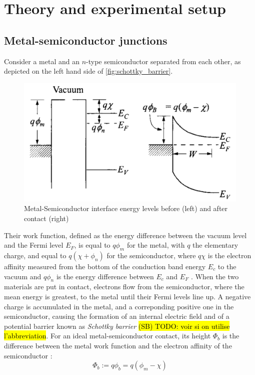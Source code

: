 \section{Theory and experimental setup}
\subsection{Metal-semiconductor junctions}
Consider a metal and an $n$-type semiconductor separated from each other, as depicted on the left hand side of \autoref{fig:schottky_barrier}.
\begin{figure}[htbp]
    \centering
    \includegraphics[width=12cm]{figures/schottky_barrier.png}
    \caption{Metal-Semiconductor interface energy levels before (left) and after contact (right) \cite{sze_physics_2007}}
    \label{fig:schottky_barrier}
\end{figure}
Their work function, defined as the energy difference between the vacuum level and the Fermi level $E_F$, is equal to $q \phi_m$ for the metal, with $q$ the elementary charge, and {equal} to $q (\chi + \phi_n)$ for the semiconductor, where $q \chi$ is the electron affinity measured from the bottom of the conduction band {energy} $E_c$ to the vacuum and $q\phi_n$ is the energy difference between $E_c$ and $E_F$ \cite{sze_physics_2007}.
When the two materials are put in contact, electrons flow from the semiconductor, where the mean energy is greatest, to the metal until their Fermi levels line up.
A negative charge is accumulated in the metal, and a correponding positive one in the semiconductor, causing the formation of an internal electric field and of a potential barrier known as \emph{Schottky barrier} \hl{(SB) TODO: voir si on utilise l'abbreviation}.
For an ideal metal-semiconductor contact, its height $\Phi_b$ is the difference between the metal work function and the electron affinity of the semiconductor \cite{sze_physics_2007}:
\begin{equation} \label{eq:barrier_height}
    \Phi_b := q\phi_b = q(\phi_m - \chi)
\end{equation}

